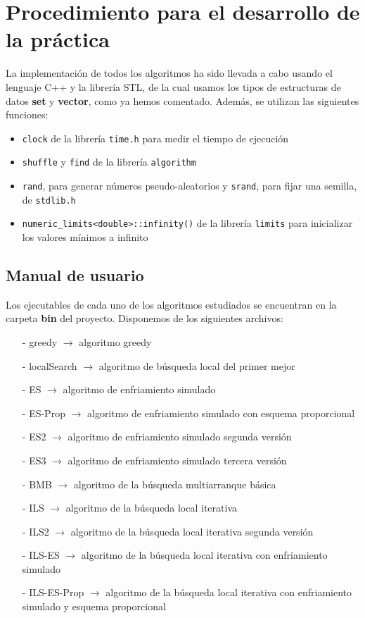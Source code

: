 \documentclass[11pt,a4paper]{article}
\begin{document}
\newpage
	\section{Procedimiento para el desarrollo de la práctica}
	
	La implementación de todos los algoritmos ha sido llevada a cabo usando el lenguaje C++ y la librería STL, de la cual usamos los tipos de estructuras de datos \textbf{set} y \textbf{vector}, como ya hemos comentado. Además, se utilizan las siguientes funciones:
	\begin{itemize}
		\item \lstinline|clock| de la librería \lstinline|time.h| para medir el tiempo de ejecución
		\item  \lstinline|shuffle| y \lstinline|find| de la librería \lstinline|algorithm|
		\item \lstinline|rand|, para generar números pseudo-aleatorios y \lstinline|srand|, para fijar una semilla, de \lstinline|stdlib.h|
		\item  \lstinline|numeric_limits<double>::infinity()| de la librería \lstinline|limits| para inicializar los valores mínimos a infinito
	\end{itemize} 

	\subsection{Manual de usuario}
	
	Los ejecutables de cada uno de los algoritmos estudiados se encuentran en la carpeta \textbf{bin} del proyecto. Disponemos de los siguientes archivos:
	\begin{itemize}
		\item [-] greedy $ \rightarrow $ algoritmo greedy
			\item [-] localSearch $ \rightarrow $  algoritmo de búsqueda local del primer mejor
			\item [-] ES $ \rightarrow $ algoritmo de enfriamiento simulado
			\item [-] ES-Prop $ \rightarrow $ algoritmo de enfriamiento simulado con esquema proporcional
			\item [-] ES2 $ \rightarrow $ algoritmo de enfriamiento simulado segunda versión
			\item [-] ES3 $ \rightarrow $ algoritmo  de enfriamiento simulado tercera versión
			\item [-]	BMB $ \rightarrow $ algoritmo de la búsqueda multiarranque básica
			\item [-]	ILS $ \rightarrow $ algoritmo de la búsqueda local iterativa
			\item [-]	ILS2 $ \rightarrow $ algoritmo de la búsqueda local iterativa segunda versión
			\item [-]	ILS-ES $ \rightarrow $ algoritmo de la búsqueda local iterativa con enfriamiento simulado
			\item [-]	ILS-ES-Prop $ \rightarrow $ algoritmo de la búsqueda local iterativa con enfriamiento simulado y esquema proporcional
	\end{itemize}
	
\end{document}
